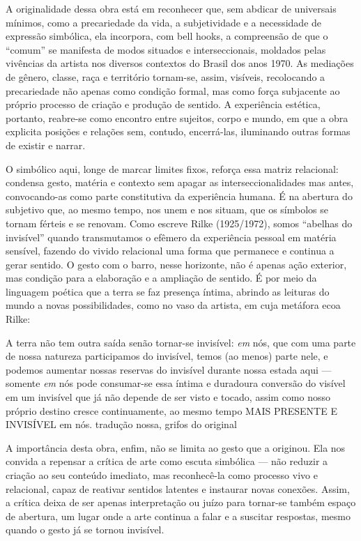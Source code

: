 A originalidade dessa obra está em reconhecer que, sem abdicar de universais mínimos, como a precariedade da vida, a subjetividade e a necessidade de expressão simbólica, ela incorpora, com bell hooks, a compreensão de que o “comum” se manifesta de modos situados e interseccionais, moldados pelas vivências da artista nos diversos contextos do Brasil dos anos 1970. As mediações de gênero, classe, raça e território tornam-se, assim, visíveis, recolocando a precariedade não apenas como condição formal, mas como força subjacente ao próprio processo de criação e produção de sentido. A experiência estética, portanto, reabre-se como encontro entre sujeitos, corpo e mundo, em que a obra explicita posições e relações sem, contudo, encerrá-las, iluminando outras formas de existir e narrar.

O simbólico aqui, longe de marcar limites fixos, reforça essa matriz relacional: condensa gesto, matéria e contexto sem apagar as interseccionalidades mas antes, convocando-as como parte constitutiva da experiência humana. É na abertura do subjetivo que, ao mesmo tempo, nos unem e nos situam, que os símbolos se tornam férteis e se renovam. Como escreve Rilke (1925/1972), somos “abelhas do invisível” quando transmutamos o efêmero da experiência pessoal em matéria sensível, fazendo do vivido relacional uma forma que permanece e continua a gerar sentido. O gesto com o barro, nesse horizonte, não é apenas ação exterior, mas condição para a elaboração e a ampliação de sentido. É por meio da linguagem poética que a terra se faz presença íntima, abrindo as leituras do mundo a novas possibilidades, como no vaso da artista, em cuja metáfora ecoa Rilke:

\begin{citacao}
  A terra não tem outra saída senão tornar-se invisível: \emph{em} nós, que com uma parte de nossa natureza participamos do invisível, temos (ao menos) parte nele, e podemos aumentar nossas reservas do invisível durante nossa estada aqui — somente \emph{em} nós pode consumar-se essa íntima e duradoura conversão do visível em um invisível que já não depende de ser visto e tocado, assim como nosso próprio destino cresce continuamente, ao mesmo tempo MAIS PRESENTE E INVISÍVEL em nós. \parencite[p.445]{rilkeLetterWitoldHulewicz1972}tradução nossa, grifos do original
\end{citacao}

A importância desta obra, enfim, não se limita ao gesto que a originou. Ela nos convida a repensar a crítica de arte como escuta simbólica — não reduzir a criação ao seu conteúdo imediato, mas reconhecê-la como processo vivo e relacional, capaz de reativar sentidos latentes e instaurar novas conexões. Assim, a crítica deixa de ser apenas interpretação ou juízo para tornar-se também espaço de abertura, um lugar onde a arte continua a falar e a suscitar respostas, mesmo quando o gesto já se tornou invisível.
